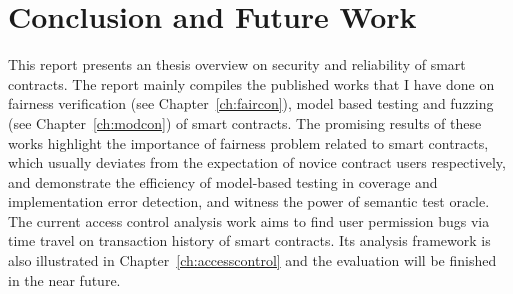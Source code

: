 \chapter{Conclusion and Future Work} %
\label{ch:conclusion} %

This report presents an thesis overview on security and reliability of smart contracts.
The report mainly compiles the published works that I have done on fairness verification (see Chapter~\ref{ch:faircon}), model based testing and fuzzing (see Chapter~\ref{ch:modcon}) of smart contracts.
The promising results of these works highlight the importance of fairness problem related to smart contracts, which usually deviates from the expectation of novice contract users respectively, and demonstrate the efficiency of model-based testing in coverage and implementation error detection, and witness the power of semantic test oracle.
The current access control analysis work aims to find user permission bugs via time travel on transaction history of smart contracts. 
Its analysis framework is also illustrated in Chapter~\ref{ch:accesscontrol} and the evaluation will be finished in the near future.

